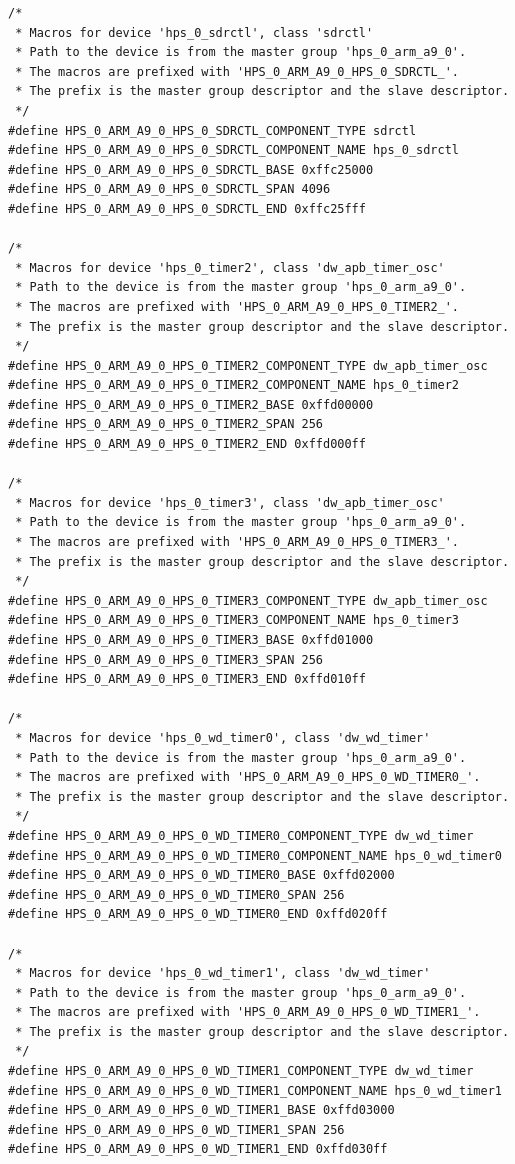 \documentclass[conference]{IEEEtran}
\begin{document}
\begin{lstlisting}
/*
 * Macros for device 'hps_0_sdrctl', class 'sdrctl'
 * Path to the device is from the master group 'hps_0_arm_a9_0'.
 * The macros are prefixed with 'HPS_0_ARM_A9_0_HPS_0_SDRCTL_'.
 * The prefix is the master group descriptor and the slave descriptor.
 */
#define HPS_0_ARM_A9_0_HPS_0_SDRCTL_COMPONENT_TYPE sdrctl
#define HPS_0_ARM_A9_0_HPS_0_SDRCTL_COMPONENT_NAME hps_0_sdrctl
#define HPS_0_ARM_A9_0_HPS_0_SDRCTL_BASE 0xffc25000
#define HPS_0_ARM_A9_0_HPS_0_SDRCTL_SPAN 4096
#define HPS_0_ARM_A9_0_HPS_0_SDRCTL_END 0xffc25fff

/*
 * Macros for device 'hps_0_timer2', class 'dw_apb_timer_osc'
 * Path to the device is from the master group 'hps_0_arm_a9_0'.
 * The macros are prefixed with 'HPS_0_ARM_A9_0_HPS_0_TIMER2_'.
 * The prefix is the master group descriptor and the slave descriptor.
 */
#define HPS_0_ARM_A9_0_HPS_0_TIMER2_COMPONENT_TYPE dw_apb_timer_osc
#define HPS_0_ARM_A9_0_HPS_0_TIMER2_COMPONENT_NAME hps_0_timer2
#define HPS_0_ARM_A9_0_HPS_0_TIMER2_BASE 0xffd00000
#define HPS_0_ARM_A9_0_HPS_0_TIMER2_SPAN 256
#define HPS_0_ARM_A9_0_HPS_0_TIMER2_END 0xffd000ff

/*
 * Macros for device 'hps_0_timer3', class 'dw_apb_timer_osc'
 * Path to the device is from the master group 'hps_0_arm_a9_0'.
 * The macros are prefixed with 'HPS_0_ARM_A9_0_HPS_0_TIMER3_'.
 * The prefix is the master group descriptor and the slave descriptor.
 */
#define HPS_0_ARM_A9_0_HPS_0_TIMER3_COMPONENT_TYPE dw_apb_timer_osc
#define HPS_0_ARM_A9_0_HPS_0_TIMER3_COMPONENT_NAME hps_0_timer3
#define HPS_0_ARM_A9_0_HPS_0_TIMER3_BASE 0xffd01000
#define HPS_0_ARM_A9_0_HPS_0_TIMER3_SPAN 256
#define HPS_0_ARM_A9_0_HPS_0_TIMER3_END 0xffd010ff

/*
 * Macros for device 'hps_0_wd_timer0', class 'dw_wd_timer'
 * Path to the device is from the master group 'hps_0_arm_a9_0'.
 * The macros are prefixed with 'HPS_0_ARM_A9_0_HPS_0_WD_TIMER0_'.
 * The prefix is the master group descriptor and the slave descriptor.
 */
#define HPS_0_ARM_A9_0_HPS_0_WD_TIMER0_COMPONENT_TYPE dw_wd_timer
#define HPS_0_ARM_A9_0_HPS_0_WD_TIMER0_COMPONENT_NAME hps_0_wd_timer0
#define HPS_0_ARM_A9_0_HPS_0_WD_TIMER0_BASE 0xffd02000
#define HPS_0_ARM_A9_0_HPS_0_WD_TIMER0_SPAN 256
#define HPS_0_ARM_A9_0_HPS_0_WD_TIMER0_END 0xffd020ff

/*
 * Macros for device 'hps_0_wd_timer1', class 'dw_wd_timer'
 * Path to the device is from the master group 'hps_0_arm_a9_0'.
 * The macros are prefixed with 'HPS_0_ARM_A9_0_HPS_0_WD_TIMER1_'.
 * The prefix is the master group descriptor and the slave descriptor.
 */
#define HPS_0_ARM_A9_0_HPS_0_WD_TIMER1_COMPONENT_TYPE dw_wd_timer
#define HPS_0_ARM_A9_0_HPS_0_WD_TIMER1_COMPONENT_NAME hps_0_wd_timer1
#define HPS_0_ARM_A9_0_HPS_0_WD_TIMER1_BASE 0xffd03000
#define HPS_0_ARM_A9_0_HPS_0_WD_TIMER1_SPAN 256
#define HPS_0_ARM_A9_0_HPS_0_WD_TIMER1_END 0xffd030ff


\end{lstlisting}
\end{document}
